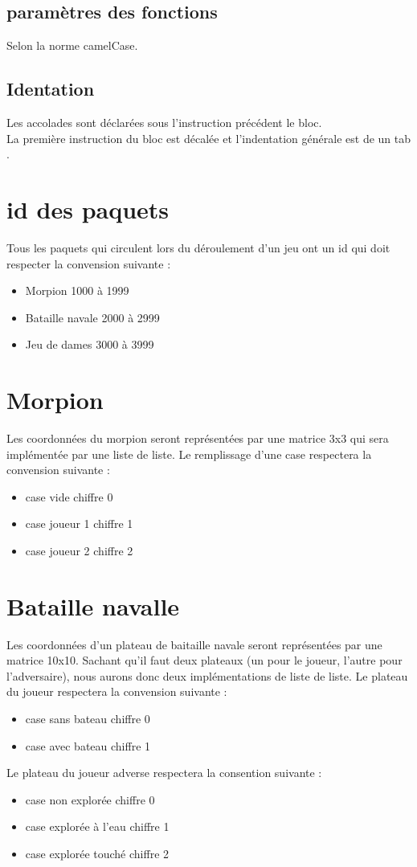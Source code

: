 \documentclass{report}
\begin{document}
\subsection{paramètres des fonctions}
Selon la norme camelCase.
\subsection{Identation}
Les accolades sont déclarées sous l’instruction précédent le bloc.\\
La première instruction du bloc est décalée et l’indentation générale est de un \og tab \fg{}.

\section{id des paquets}
Tous les paquets qui circulent lors du déroulement d'un jeu ont un id qui doit respecter la convension suivante :
\begin{itemize}
	\item Morpion \tabto{4cm} 1000 à 1999
	\item Bataille navale \tabto{4cm} 2000 à 2999
	\item Jeu de dames \tabto{4cm} 3000 à 3999
\end{itemize}
\section{Morpion}
Les coordonnées du morpion seront représentées par une matrice 3x3 qui sera implémentée par une liste de liste.
Le remplissage d'une case respectera la convension suivante :
\begin{itemize}
	\item case vide \tabto{4cm} chiffre 0
	\item case joueur 1 \tabto{4cm} chiffre 1
	\item case joueur 2 \tabto{4cm} chiffre 2
\end{itemize}
\section{Bataille navalle}
Les coordonnées d'un plateau de baitaille navale seront représentées par une matrice 10x10. Sachant qu'il faut deux plateaux (un pour le joueur, l'autre pour l'adversaire),
nous aurons donc deux implémentations de liste de liste.
Le plateau du joueur respectera la convension suivante :
\begin{itemize}
	\item case sans bateau \tabto{4cm} chiffre 0
	\item case avec bateau \tabto{4cm} chiffre 1
\end{itemize}
Le plateau du joueur adverse respectera la consention suivante :
\begin{itemize}
	\item case non explorée \tabto{4cm} chiffre 0
	\item case explorée \og à l'eau \fg{} \tabto{4cm} chiffre 1
	\item case explorée \og touché \fg{} \tabto{4cm} chiffre 2
\end{itemize}
\end{document}
